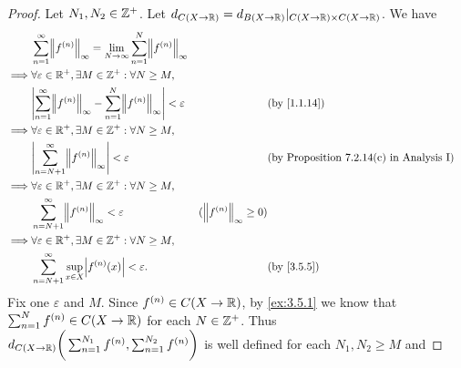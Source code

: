 \begin{proof}
  Let \(N_1, N_2 \in \mathbb{Z}^+\).
  Let \(d_{C(X \to \mathbb{R})} = d_{B(X \to \mathbb{R})}|_{C(X \to \mathbb{R}) \times C(X \to \mathbb{R})}\).
  We have
  \begin{align*}
             & \sum_{n = 1}^\infty \norm*{f^{(n)}}_\infty = \lim_{N \to \infty} \sum_{n = 1}^N \norm*{f^{(n)}}_\infty                                                                                     \\
    \implies & \forall \varepsilon \in \R^+, \exists M \in \Z^+ : \forall N \geq M,                                                                                                                       \\
             & \abs{\sum_{n = 1}^\infty \norm*{f^{(n)}}_\infty - \sum_{n = 1}^N \norm*{f^{(n)}}_\infty} < \varepsilon &                                 & \by{1.1.14}                                     \\
    \implies & \forall \varepsilon \in \R^+, \exists M \in \Z^+ : \forall N \geq M,                                                                                                                       \\
             & \abs{\sum_{n = N + 1}^\infty \norm*{f^{(n)}}_\infty} < \varepsilon                                     &                                 & \text{(by Proposition 7.2.14(c) in Analysis I)} \\
    \implies & \forall \varepsilon \in \R^+, \exists M \in \Z^+ : \forall N \geq M,                                                                                                                       \\
             & \sum_{n = N + 1}^\infty \norm*{f^{(n)}}_\infty < \varepsilon                                           & (\norm*{f^{(n)}}_\infty \geq 0)                                                   \\
    \implies & \forall \varepsilon \in \R^+, \exists M \in \Z^+ : \forall N \geq M,                                                                                                                       \\
             & \sum_{n = N + 1}^\infty \sup_{x \in X} \abs{f^{(n)}(x)} < \varepsilon.                                 &                                 & \by{3.5.5}
  \end{align*}
  Fix one \(\varepsilon\) and \(M\).
  Since \(f^{(n)} \in C(X \to \mathbb{R})\), by \cref{ex:3.5.1} we know that \(\sum_{n = 1}^N f^{(n)} \in C(X \to \mathbb{R})\) for each \(N \in \mathbb{Z}^+\).
  Thus \(d_{C(X \to \mathbb{R})}\bigg(\sum_{n = 1}^{N_1} f^{(n)}, \sum_{n = 1}^{N_2} f^{(n)}\bigg)\) is well defined for each \(N_1, N_2 \geq M\) and

\end{proof}
